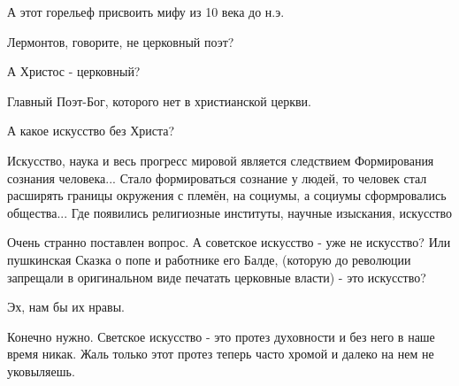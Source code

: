 \begin{itemize}
А этот горельеф присвоить мифу из 10 века до н.э.

Лермонтов, говорите, не церковный поэт?

А Христос - церковный?

Главный Поэт-Бог, которого нет в христианской церкви.

А какое искусство без Христа?


Искусство, наука и весь прогресс мировой является следствием Формирования
сознания человека... Стало формироваться сознание у людей, то человек стал
расширять границы окружения с племён, на социумы, а социумы сформровались
общества... Где появились религиозные институты, научные изыскания, искусство


Очень странно поставлен вопрос. А советское искусство - уже не искусство? Или
пушкинская Сказка о попе и работнике его Балде, (которую до революции запрещали
в оригинальном виде печатать церковные власти) - это искусство?


Эх, нам бы их нравы.

Конечно нужно. Светское искусство - это протез духовности и без него в наше
время никак. Жаль только этот протез теперь часто хромой и далеко на нем не
уковыляешь.

\end{itemize} %
